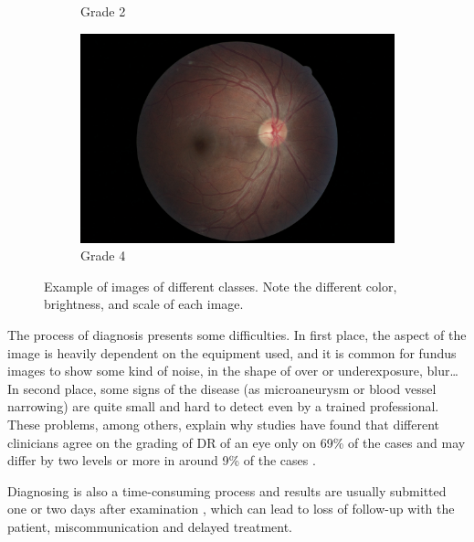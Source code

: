 \begin{figure}[tb]
\begin{subfigure}[b]{0.3\textwidth}
        \caption{Grade 2}
    \end{subfigure}
    \hfill
     \begin{subfigure}[b]{0.3\textwidth}
        \centering
        \includegraphics[width=\textwidth, height=\textwidth]{figures/chapter4/Dataset/proliferative/352_right.jpeg}
        \caption{Grade 4}
    \end{subfigure}
    \caption{Example of images of different classes. Note the different color, brightness, and scale of each image.}
    \label{fig:disease_summary}
\end{figure}

The process of diagnosis presents some difficulties. In first place, the aspect of the image is heavily dependent on the equipment used, and it is common for fundus images to show some kind of noise, in the shape of over or underexposure, blur… In second place, some signs of the disease (as microaneurysm or blood vessel narrowing) are quite small and hard to detect even by a trained professional. These problems, among others, explain why studies have found that different clinicians agree on the grading of DR of an eye only on 69\% of the cases and may differ by two levels or more in around 9\% of the cases \cite{gangaputra2013comparison}. 

Diagnosing is also a time-consuming process and results are usually submitted one or two days after examination \cite{diabeticretinopathydetection}, which can lead to loss of follow-up with the patient, miscommunication and delayed treatment.

